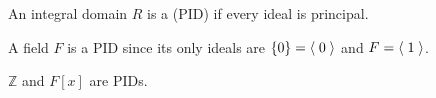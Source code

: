 \begin{defn}
\label{defn:principal_ideal_domain}
  An integral domain $R$ is a  (PID) if every ideal is principal.
\end{defn}

\begin{eg}
  A field $F$ is a PID since its only ideals are $\{0\} = \langle \; 0 \; \rangle$ and $F = \langle \; 1 \; \rangle$.
\end{eg}

\begin{eg}
  $\mathbb{Z}$ and $F[x]$ are PIDs.
\end{eg}



